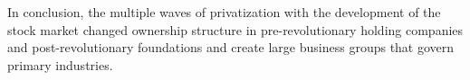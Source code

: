 \begin{appendices}
	In conclusion, the multiple waves of privatization with the development of the stock market changed ownership structure in pre-revolutionary holding companies and post-revolutionary foundations and create large business groups that govern primary  industries.
	
	

%		
%	
	
	
	\FloatBarrier

\end{appendices}

